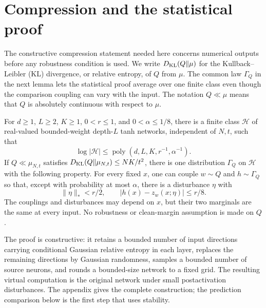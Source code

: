 \section{Compression and the statistical proof}
\label{sec:theory-statistical}

The constructive compression statement needed here concerns numerical
outputs before any robustness condition is used.
We write $D_{\rm KL}(Q\Vert\mu)$ for the Kullback--Leibler (KL)
divergence, or relative entropy, of $Q$ from $\mu$. The common law
$\Gamma_Q$ in the next lemma lets the statistical proof average over one
finite class even though the comparison coupling can vary with the input.
The notation $Q\ll\mu$ means that $Q$ is absolutely continuous with
respect to $\mu$.

\begin{lemma}
\label{lem:raw-entropy-compression}
For $d\ge1$, $L\ge2$, $K\ge1$, $0<r\le1$, and
$0<\alpha\le1/8$, there is a finite class $\mathcal H$ of real-valued
bounded-weight depth-$L$ tanh networks, independent of $N,t$, such that
\[
 \log|\mathcal H|\le
       \operatorname{poly}(d,L,K,r^{-1},\alpha^{-1}).
\]
If $Q\ll\mu_{N,t}$ satisfies
$D_{\rm KL}(Q\Vert\mu_{N,t})\le NK/t^2$, there is one distribution
$\Gamma_Q$ on $\mathcal H$ with the following property. For every fixed
$x$, one can couple $w\sim Q$ and $h\sim\Gamma_Q$ so that, except with
probability at most $\alpha$, there is a disturbance $\eta$ with
\[
 \|\eta\|_*<r/2,\qquad
 |h(x)-z_w(x;\eta)|\le r/8.
\]
The couplings and disturbances may depend on $x$, but their two marginals
are the same at every input. No robustness or clean-margin assumption is
made on $Q$.
\end{lemma}

The proof is constructive: it retains a bounded number of input directions
carrying conditional Gaussian relative entropy in each layer, replaces the
remaining directions by Gaussian randomness, samples a bounded number of
source neurons, and rounds a bounded-size network to a fixed grid.
The resulting virtual computation is the original network under small
postactivation disturbances. The appendix gives the complete construction;
the prediction comparison below is the first step that uses stability.

